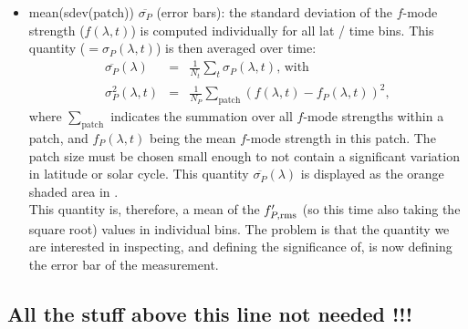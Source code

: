 \documentclass{aa}
\begin{document}
\begin{itemize}
\item mean(sdev(patch)) $\overline{\sigma_P}$ (error bars): the standard deviation of the $f$-mode strength
($f(\lambda,t)$)
 is computed individually for all lat / time bins. This quantity  ($=\sigma_P(\lambda,t)$) is then averaged over time:
\begin{eqnarray}
\overline{\sigma_P}(\lambda) &=&  \frac{1}{N_t} \sum_{t}  \sigma_P(\lambda,t) \mbox{, with} \\
\sigma_P^2(\lambda,t) &=& \frac{1}{N_P}\sum_{\mbox{patch}} ( f(\lambda,t)
- f_P(\lambda,t) )^2,
\end{eqnarray} 
where $\sum_{\mbox{patch}}$ indicates the summation over all $f$-mode strengths within a patch, and $f_P(\lambda,t)$ being the mean $f$-mode strength in this patch. The patch size must be chosen small enough to not contain a significant variation in latitude or solar cycle. 
This quantity $\overline{\sigma_P}(\lambda)$ is displayed as the orange shaded area in .\\
This quantity is, therefore, a mean of the $f'_{P, {\rm rms}}$ (so this time also taking the square root) values in individual bins. The problem is that the quantity we are interested in inspecting, and defining the significance of, is now defining the error bar of the measurement. 
\end{itemize}
\subsection*{All the stuff above this line not needed !!!}
\color{black}


\end{document}
